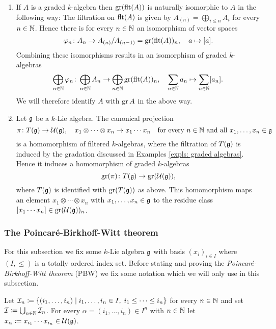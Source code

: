 \begin{expls}
 \begin{enumerate}[leftmargin=*]
  \item
   If $A$ is a graded $k$-algebra then $\operatorname{gr}(\operatorname{flt}(A))$ is naturally isomorphic to $A$ in the following way: The filtration on $\operatorname{flt}(A)$ is given by $A_{(n)} = \bigoplus_{i \leq n} A_i$ for every $n \in \mathbb{N}$. Hence there is for every $n \in \mathbb{N}$ an isomorphism of vector spaces
   \[
    \varphi_n \colon A_n \to A_{(n)}/A_{(n-1)} = \operatorname{gr}(\operatorname{flt}(A))_n, \quad a \mapsto [a].
   \]
   Combining these isomorphisms results in an isomorphism of graded $k$-algebras
   \[
    \bigoplus_{n \in \mathbb{N}} \varphi_n \colon
    \bigoplus_{n \in \mathbb{N}} A_n \to \bigoplus_{n \in \mathbb{N}} \operatorname{gr}(\operatorname{flt}(A))_n, \quad
    \sum_{n \in \mathbb{N}} a_n \mapsto \sum_{n \in \mathbb{N}} [a_n].
   \]
   We will therefore identify $A$ with $\operatorname{gr} A$ in the above way.
  \item
   Let $\mathfrak{g}$ be a $k$-Lie algebra. The canonical projection
   \[
    \pi \colon T(\mathfrak{g}) \to \mathcal{U}(\mathfrak{g}), \quad x_1 \otimes \dotsb \otimes x_n \to x_1 \dotsm x_n
    \quad \text{for every $n \in \mathbb{N}$ and all $x_1, \dotsc, x_n \in \mathfrak{g}$}
   \]
   is a homomorphism of filtered $k$-algebras, where the filtration of $T(\mathfrak{g})$ is induced by the gradation discussed in Examples \ref{expls: graded algebras}. Hence it induces a homomorphism of graded $k$-algebras
   \[
    \operatorname{gr}(\pi) \colon T(\mathfrak{g}) \to \operatorname{gr}(\mathcal{U}(\mathfrak{g})),
   \]
   where $T(\mathfrak{g})$ is identified with $\operatorname{gr}(T(\mathfrak{g}))$ as above. This homomorphism maps an element $x_1 \otimes \dotsb \otimes x_n$ with $x_1, \dots, x_n \in \mathfrak{g}$ to the residue class $[x_1 \dotsm x_n] \in \operatorname{gr}(\mathcal{U}(\mathfrak{g}))_n$.
 \end{enumerate}
\end{expls}



\subsubsection{The Poincar\'{e}-Birkhoff-Witt theorem}
For this subsection we fix some $k$-Lie algebra $\mathfrak{g}$ with basis $(x_i)_{i \in I}$ where $(I, \leq)$ is a totally ordered index set. Before stating and proving the \emph{Poincar\'{e}-Birkhoff-Witt theorem} (PBW) we fix some notation which we will only use in this subsection.


\begin{defi}
 Let $\mathcal{I}_n \coloneqq \{(i_1, \dotsc, i_n) \mid i_1, \dotsc, i_n \in I, \; i_1 \leq \dotsb \leq i_n\}$ for every $n \in \mathbb{N}$ and set $\mathcal{I} \coloneqq \bigcup_{n \in \mathbb{N}} \mathcal{I}_n$. For every $\alpha = (i_1, \dotsc, i_n) \in I^n$ with $n \in \mathbb{N}$ let $x_\alpha \coloneqq x_{i_1} \dotsm x_{i_n} \in \mathcal{U}(\mathfrak{g})$.
\end{defi}


